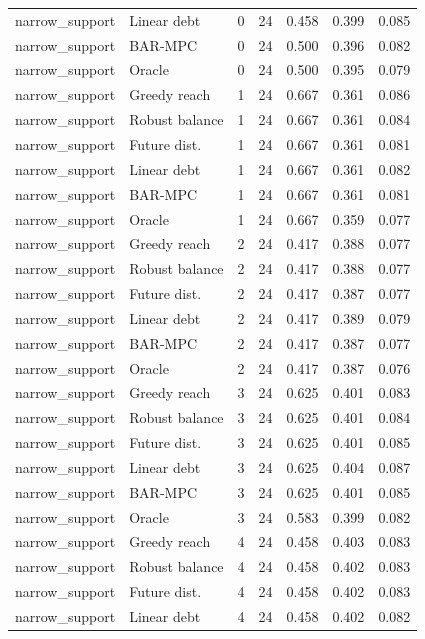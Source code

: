 \begin{longtable}{llrrrrr}
narrow\_support & Linear debt & 0 & 24 & 0.458 & 0.399 & 0.085 \\
narrow\_support & BAR-MPC & 0 & 24 & 0.500 & 0.396 & 0.082 \\
narrow\_support & Oracle & 0 & 24 & 0.500 & 0.395 & 0.079 \\
narrow\_support & Greedy reach & 1 & 24 & 0.667 & 0.361 & 0.086 \\
narrow\_support & Robust balance & 1 & 24 & 0.667 & 0.361 & 0.084 \\
narrow\_support & Future dist. & 1 & 24 & 0.667 & 0.361 & 0.081 \\
narrow\_support & Linear debt & 1 & 24 & 0.667 & 0.361 & 0.082 \\
narrow\_support & BAR-MPC & 1 & 24 & 0.667 & 0.361 & 0.081 \\
narrow\_support & Oracle & 1 & 24 & 0.667 & 0.359 & 0.077 \\
narrow\_support & Greedy reach & 2 & 24 & 0.417 & 0.388 & 0.077 \\
narrow\_support & Robust balance & 2 & 24 & 0.417 & 0.388 & 0.077 \\
narrow\_support & Future dist. & 2 & 24 & 0.417 & 0.387 & 0.077 \\
narrow\_support & Linear debt & 2 & 24 & 0.417 & 0.389 & 0.079 \\
narrow\_support & BAR-MPC & 2 & 24 & 0.417 & 0.387 & 0.077 \\
narrow\_support & Oracle & 2 & 24 & 0.417 & 0.387 & 0.076 \\
narrow\_support & Greedy reach & 3 & 24 & 0.625 & 0.401 & 0.083 \\
narrow\_support & Robust balance & 3 & 24 & 0.625 & 0.401 & 0.084 \\
narrow\_support & Future dist. & 3 & 24 & 0.625 & 0.401 & 0.085 \\
narrow\_support & Linear debt & 3 & 24 & 0.625 & 0.404 & 0.087 \\
narrow\_support & BAR-MPC & 3 & 24 & 0.625 & 0.401 & 0.085 \\
narrow\_support & Oracle & 3 & 24 & 0.583 & 0.399 & 0.082 \\
narrow\_support & Greedy reach & 4 & 24 & 0.458 & 0.403 & 0.083 \\
narrow\_support & Robust balance & 4 & 24 & 0.458 & 0.402 & 0.083 \\
narrow\_support & Future dist. & 4 & 24 & 0.458 & 0.402 & 0.083 \\
narrow\_support & Linear debt & 4 & 24 & 0.458 & 0.402 & 0.082 \\

\end{longtable}
